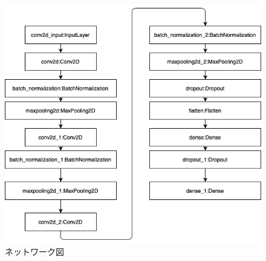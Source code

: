\documentclass[a4paper, 11pt, titlepage]{jsarticle}
\begin{document}
\begin{figure}
 \centering
  \includegraphics[scale=0.5]{model.png}
  \caption{ネットワーク図}
  \label{cnn4}
\end{figure}
\end{document}
